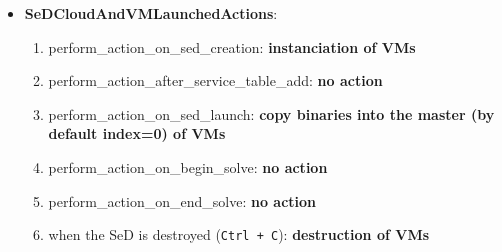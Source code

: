 \begin{itemize}
  \item \textbf{SeDCloudAndVMLaunchedActions}:
    \begin{enumerate}
      \item perform\_action\_on\_sed\_creation: \textbf{instanciation of VMs}
      \item perform\_action\_after\_service\_table\_add: \textbf{no action}
      \item perform\_action\_on\_sed\_launch: \textbf{copy binaries into the master (by default index=0) of VMs}
      \item perform\_action\_on\_begin\_solve: \textbf{no action}
      \item perform\_action\_on\_end\_solve: \textbf{no action}
      \item when the SeD is destroyed (\texttt{Ctrl + C}): \textbf{destruction of VMs}
    \end{enumerate}
 

\end{itemize}
